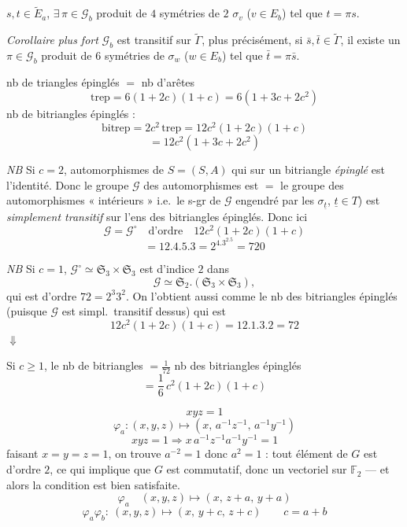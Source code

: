\documentclass[11pt,a4paper]{article}
\begin{document}
$s,t\in\widetilde{E}_a$, $\exists\,\pi\in\mathcal{G}_b$ produit de $4$
\struck{\ill{}} symétries de $2$  $\sigma_v$
($v\in E_b$) tel que $t=\pi s$.

\emph{Corollaire plus fort} $\mathcal{G}_b$ est transitif sur
$\widetilde{\Gamma}$, plus précisément, si $\bar s,\bar t\in\widetilde{\Gamma}$, il
existe un $\pi\in\mathcal{G}_b$ produit de $6$ symétries de 
$\sigma_w$ ($w\in E_b$) tel que $\bar t=\pi\bar s$.

nb de triangles épinglés $=$ nb d'arêtes
\[
  \mathrm{trep}=6(1+2c)(1+c)=6(1+3c+2c^2)
\]
nb de bitriangles épinglés : \struck{\ill{}}
\[
  \mathrm{bitrep}=2c^2\,\mathrm{trep}=12c^2(1+2c)(1+c)
\]
\[
  =12c^2(1+3c+2c^2)
\]

\emph{NB} Si $c=2$,  automorphismes de $S=(S,A)$ qui
\struck{\ill{}}  sur un bitriangle \emph{épinglé} est
l'identité. Donc le groupe $\mathcal{G}$ des automorphismes \struck{\ill{}} est
$=$ le groupe \struck{\ill{}} des automorphismes « intérieurs » i.e.\ le s-gr de
$\mathcal{G}$ engendré par les $\sigma_{\underline{t}}$, $\underline{t}\in T$) est
\emph{simplement transitif} sur l'ens des bitriangles épinglés. Donc ici
\[
  \mathcal{G}=\mathcal{G}^{\circ}\quad\text{d'ordre}\quad 12c^2(1+2c)(1+c)
\]
\[
  =12.4.5.3=2^4.3^2.5=720
\]

\emph{NB} Si $c=1$,
$\mathcal{G}^{\circ}\simeq\mathfrak{S}_3\times\mathfrak{S}_3$ \struck{\ill{}} est
d'indice $2$ dans
\[
  \mathcal{G}\simeq\mathfrak{S}_2.(\mathfrak{S}_3\times\mathfrak{S}_3),
\]
qui est d'ordre $72=2^3 3^2$. On l'obtient aussi comme le nb des bitriangles
épinglés (puisque $\mathcal{G}$ est simpl.\ transitif dessus) qui est
\[
  12c^2(1+2c)(1+c)=12.1.3.2=72
\]
$\Downarrow$

Si $c\geqslant1$, le nb de bitriangles $=\frac1{72}$ nb des bitriangles épinglés
\[
  =\frac16\,c^2(1+2c)(1+c)
\]


\[
  xyz=1
\]
\[
  \varphi_a:(x,y,z)\longmapsto(x,\,a^{-1}z^{-1},\,a^{-1}y^{-1})
\]
\[
  xyz=1\Longrightarrow x\,a^{-1}z^{-1}a^{-1}y^{-1}=1
\]
faisant $x=y=z=1$, on trouve $a^{-2}=1$ donc
$a^2=1$ : tout élément de $G$ est d'ordre $2$, ce qui implique que $G$ est
 commutatif, donc un vectoriel sur $\mathbb{F}_2$ — et alors la
condition est bien satisfaite.
\[
  \varphi_a\quad(x,y,z)\longmapsto(x,\,z+a,\,y+a)
\]
\[
  \varphi_a\varphi_b:\ (x,y,z)\longmapsto(x,\,y+c,\,z+c)\qquad c=a+b
\]
\end{document}
